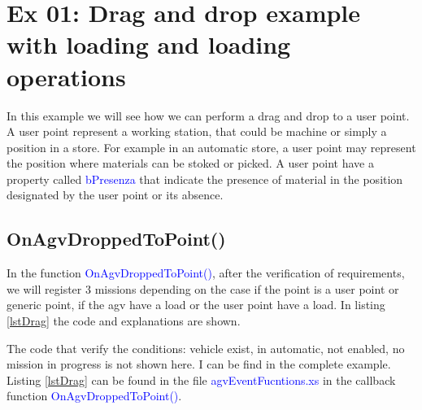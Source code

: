 %
\section{Ex 01: Drag and drop example with loading and loading operations}

In this example we will see how we can perform a drag and drop to a user point. A user point represent a working station, that could be machine or simply a position in a store. For example in an automatic store, a user point may represent the position where materials can be stoked or picked. A user point have a property called \textcolor{blue}{bPresenza} that indicate the presence of material in the position designated by the user point or its absence.\\

%
\subsection*{OnAgvDroppedToPoint()}
In the function \textcolor{blue}{OnAgvDroppedToPoint()}, after the verification of requirements, we will register 3 missions depending on the case if the point is a user point or generic point, if the agv have a load or the user point have a load. In listing \ref{lstDrag} the code and explanations are shown.

The code that verify the conditions: vehicle exist, in automatic, not enabled, no mission in progress is not shown here. I can be find in the complete example.\\

Listing \ref{lstDrag} can be found in the file \textcolor{blue}{agvEventFucntions.xs} in the callback function \textcolor{blue}{OnAgvDroppedToPoint()}.

